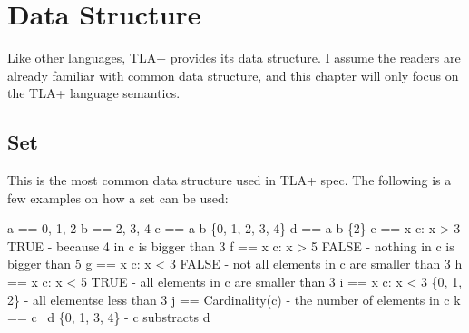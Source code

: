
% 

\chapter{Data Structure}

Like other languages, TLA+ provides its data structure. I assume the readers are
already familiar with common data structure, and this chapter will only focus on
the TLA+ language semantics. 

\section{Set}

This is the most common data structure used in TLA+ spec. The following is a few examples on
how a set can be used:\newline
\begin{tla}
a == {0, 1, 2}
b == {2, 3, 4}
c == a \union b         \* \{0, 1, 2, 3, 4\}
d == a \intersect b     \* \{2\}
e == \E x \in c: x > 3  \* TRUE - because 4 in c is bigger than 3
f == \E x \in c: x > 5  \* FALSE - nothing in c is bigger than 5
g == \A x \in c: x < 3  \* FALSE - not all elements in c are smaller than 3
h == \A x \in c: x < 5  \* TRUE - all elements in c are smaller than 3
i == {x \in c: x < 3}   \* \{0, 1, 2\} - all elementse less than 3
j == Cardinality(c)      - the number of elements in c
k == c \ d              \* \{0, 1, 3, 4\} - c substracts d
\end{tla}
\begin{tlatex}
%
%
%
%
\@xx{}%
%
%
\@xx{}%
%
%
\@xx{}%
%
%
\@xx{}%
%
%
\@xx{}%
%
%
\@xx{}%
%
%
\@xx{}%
%
%
\@xx{}%
%
%
\@xx{}%
\end{tlatex}

